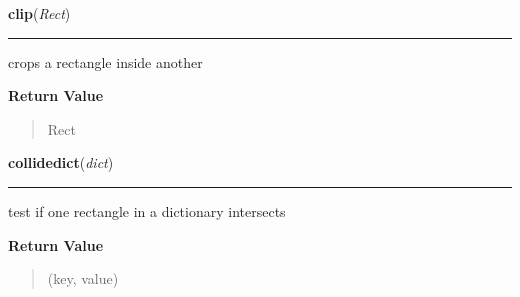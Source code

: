 \hspace{.8\funcindent}\begin{boxedminipage}{\funcwidth}

    \raggedright \textbf{clip}(\textit{Rect})

    \vspace{-1.5ex}

    \rule{\textwidth}{0.5\fboxrule}
\setlength{\parskip}{2ex}
    crops a rectangle inside another

\setlength{\parskip}{1ex}
      \textbf{Return Value}
    \vspace{-1ex}

      \begin{quote}
      Rect

      \end{quote}

    \end{boxedminipage}

    \label{pygame:Rect:collidedict}

    \vspace{0.5ex}

\hspace{.8\funcindent}\begin{boxedminipage}{\funcwidth}

    \raggedright \textbf{collidedict}(\textit{dict})

    \vspace{-1.5ex}

    \rule{\textwidth}{0.5\fboxrule}
\setlength{\parskip}{2ex}
    test if one rectangle in a dictionary intersects

\setlength{\parskip}{1ex}
      \textbf{Return Value}
    \vspace{-1ex}

      \begin{quote}
      (key, value)

      \end{quote}

    \end{boxedminipage}

    \label{pygame:Rect:collidedictall}

    \vspace{0.5ex}

